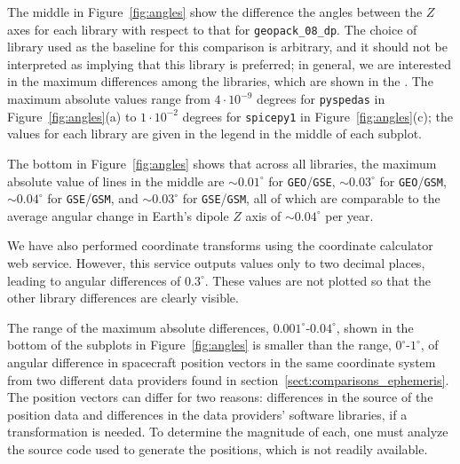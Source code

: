 \documentclass[draft]{agujournal2019}
\begin{document}
The middle  in Figure~\ref{fig:angles} show the difference  the angles between the $Z$ axes for each library with respect to that for \texttt{geopack\_08\_dp}. The choice of library used as the baseline for this comparison is arbitrary, and it should not be interpreted as implying that this library is preferred; in general, we are interested in the maximum differences among the libraries, which are shown in the   . The maximum absolute values  range from $4\cdot 10^{-9}$ degrees for \texttt{pyspedas} in Figure~\mbox{\ref{fig:angles}}(a) to $1\cdot 10^{-2}$ degrees for \texttt{spicepy1} in Figure~\mbox{\ref{fig:angles}}(c); the values for each library are given in the legend in the middle  of each subplot. 

The bottom  in Figure~\ref{fig:angles} shows that across all libraries, the maximum absolute value of lines in the middle  are ${\sim}0.01^\circ$ for \texttt{GEO}/\texttt{GSE}, ${\sim} 0.03^\circ$ for \texttt{GEO}/\texttt{GSM}, ${\sim}0.04^\circ$ for \texttt{GSE}/\texttt{GSM}, and ${\sim}0.03^\circ$ for \texttt{GSE}/\texttt{GSM}, all of which are comparable to the average angular change in Earth's dipole $Z$ axis of ${\sim}0.04^\circ$ per year.

We have also performed coordinate transforms using the  coordinate calculator web service. However, this service outputs values only to two decimal places, leading to angular differences of $0.3^\circ$. These values are not plotted so that the other library differences are clearly visible.

The range of the maximum absolute differences, $0.001^\circ$-$0.04^\circ$, shown in the bottom  of the subplots in Figure~\ref{fig:angles} is smaller than the range, $0^\circ$-$1^\circ$, of angular difference in spacecraft position vectors in the same coordinate system from two different data providers found in section~\ref{sect:comparisons_ephemeris}. The position vectors can differ for two reasons: differences in the source of the position data and differences in the data providers' software libraries, if a transformation is needed. To determine the magnitude of each, one must analyze the source code used to generate the positions, which is not readily available.
\end{document}
